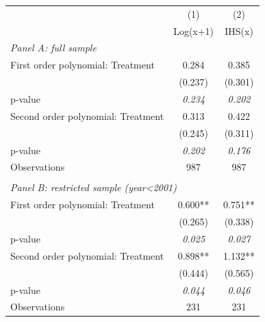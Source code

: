 \begin{tabular}{lcc}
 & (1) & (2) \\
 & Log(x+1) & IHS(x) \\
\multicolumn{3}{l}{\textit{Panel A: full sample}} \\
First order polynomial: Treatment & 0.284 & 0.385 \\
 & (0.237) & (0.301) \\
p-value & \textit{0.234} & \textit{0.202} \\
Second order polynomial: Treatment & 0.313 & 0.422 \\
 & (0.245) & (0.311) \\
p-value & \textit{0.202} & \textit{0.176} \\
Observations & 987 & 987 \\
 & & \\
\multicolumn{3}{l}{\textit{Panel B: restricted sample (year<2001)}} \\
First order polynomial: Treatment & 0.600** & 0.751** \\
 & (0.265) & (0.338) \\
p-value & \textit{0.025} & \textit{0.027} \\
Second order polynomial: Treatment & 0.898** & 1.132** \\
 & (0.444) & (0.565) \\
p-value & \textit{0.044} & \textit{0.046} \\
Observations & 231 & 231 \\
\end{tabular}
